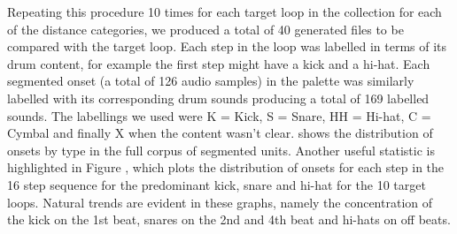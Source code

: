 Repeating this procedure 10 times for each target loop in the collection for each of the distance categories, we produced a total of 40 generated files to be compared with the target loop. Each step in the loop was labelled in terms of its drum content, for example the first step might have a kick and a hi-hat. Each segmented onset (a total of 126 audio samples)  in the palette was similarly labelled with its corresponding drum sounds producing a total of 169 labelled sounds. The labellings we used were K = Kick, S = Snare, HH = Hi-hat, C = Cymbal and finally X when the content wasn’t clear.  shows the distribution of onsets by type in the full corpus of segmented units. Another useful statistic is highlighted in Figure , which plots the distribution of onsets for each step in the 16 step sequence for the predominant kick, snare and hi-hat for the 10 target loops. Natural trends are evident in these graphs, namely the concentration of the kick on the 1st beat, snares on the 2nd and 4th beat and hi-hats on off beats.

